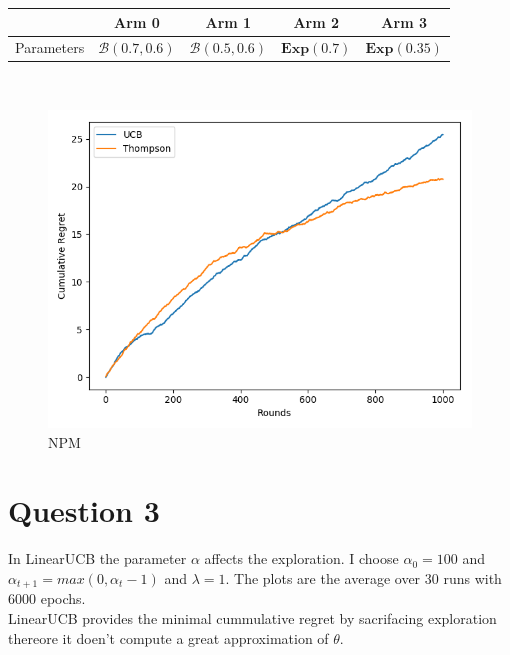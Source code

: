 \documentclass[10pt,a4paper]{article}
\begin{document}
\begin{tabular}{|c|c|c|c|c|}
\hline 
 & Arm 0 & Arm 1 & Arm 2 & Arm 3 \\ 
\hline 
Parameters & $\mathcal{B}(0.7,0.6)$ & $\mathcal{B}(0.5,0.6)$ & $\mathbf{Exp}(0.7)$ & $\mathbf{Exp}(0.35)$ \\ 
\hline 
\end{tabular} 
\\
\begin{figure}[h]
\centering
\begin{minipage}{0,45\textwidth}
\caption{NPM}
\includegraphics[scale=.45]{npm.png}
\end{minipage}
\end{figure}
\newpage
\section{Question 3}
In LinearUCB the parameter $\alpha$ affects the exploration. I choose $\alpha_0 = 100$ and $\alpha_{t+1} = max(0,\alpha_t - 1)$ and $\lambda = 1$. The plots are the average over 30 runs with 6000 epochs.\\
LinearUCB provides the minimal cummulative regret by sacrifacing exploration thereore it doen't compute a great approximation of $\theta$.
\end{document}
